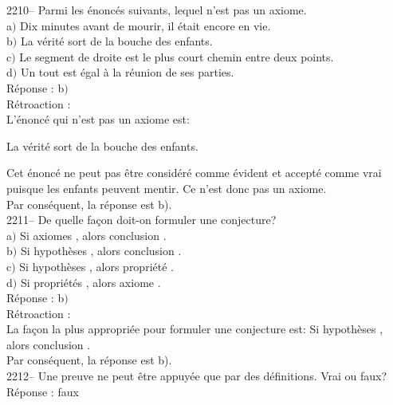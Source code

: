 \documentclass[letterpaper, 12pt]{article}
\begin{document}
2210-- Parmi les \'enonc\'es suivants, lequel n'est pas un axiome. \\

a$)$ Dix minutes avant de mourir, il \'etait encore en vie.\\
b$)$ La v\'erit\'e sort de la bouche des enfants.\\
c$)$ Le segment de droite est le plus court chemin entre deux points.\\
d$)$ Un tout est \'egal \`a la r\'eunion de ses parties.\\


R\'eponse : b$)$\\

R\'etroaction :\\
L'\'enonc\'e qui n'est pas un axiome est:
\begin{center}
\og La v\'erit\'e sort de la bouche des enfants.\fg
\end{center}
Cet \'enonc\'e ne peut pas \^etre consid\'er\'e comme \'evident et accept\'e comme vrai puisque les enfants peuvent mentir. Ce n'est donc pas un axiome.\\
Par cons\'equent, la r\'eponse est b).\\

2211-- De quelle fa\c con doit-on formuler une conjecture? \\

a$)$ Si \og axiomes \fg , alors \og conclusion \fg .\\
b$)$ Si \og hypoth\`eses \fg , alors \og conclusion \fg .\\
c$)$ Si \og hypoth\`eses \fg , alors \og propri\'et\'e \fg .\\
d$)$ Si \og propri\'et\'es \fg , alors \og axiome \fg .\\

R\'eponse : b$)$\\

R\'etroaction :\\
La fa\c con la plus appropri\'ee pour formuler une conjecture est: \og Si \og hypoth\`eses \fg , alors \og conclusion \fg \fg.\\
Par cons\'equent, la r\'eponse est b).\\


2212-- Une preuve ne peut \^etre appuy\'ee que par des d\'efinitions. Vrai ou faux?\\

R\'eponse : faux\\
\end{document}

